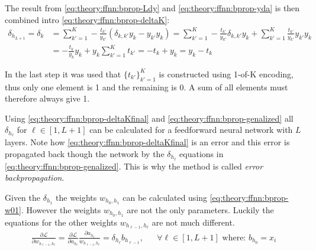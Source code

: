 The result from \eqref{eq:theory:ffnn:bprop-Ldy} and \eqref{eq:theory:ffnn:bprop-yda} is then combined intro \eqref{eq:theory:ffnn:bprop-deltaK}:
\begin{equation}
\begin{aligned}
\delta_{h_{L + 1}} = \delta_k &= \sum_{k'=1}^K -\frac{t_{k'}}{y_{k'}} \left( \delta_{k, k'} y_k - y_{k'} y_k \right) = \sum_{k'=1}^K -\frac{t_{k'}}{y_{k'}} \delta_{k, k'} y_k + \sum_{k'=1}^K \frac{t_{k'}}{y_{k'}} y_{k'} y_k \\
&= -\frac{t_k}{y_k} y_k + y_k \sum_{k'=1}^K t_{k'} = -t_k + y_k = y_k - t_k
\end{aligned}
\label{eq:theory:ffnn:bprop-deltaKfinal}
\end{equation}

In the last step it was used that $\{ t_{k'} \}_{k'=1}^K$ is constructed using 1-of-K encoding, thus only one element is 1 and the remaining is 0. A sum of all elements must therefore always give 1.

Using \eqref{eq:theory:ffnn:bprop-deltaKfinal} and \eqref{eq:theory:ffnn:bprop-genalized} all $\delta_{h_\ell}$ for $\ell \in [1, L+1]$ can be calculated for a feedforward neural network with $L$ layers. Note how \eqref{eq:theory:ffnn:bprop-deltaKfinal} is an error and this error is propagated back though the network by the $\delta_{h_\ell}$ equations in \eqref{eq:theory:ffnn:bprop-genalized}. This is why the method is called \textit{error backpropagation}.

Given the $\delta_{h_1}$ the weights $w_{h_0, h_1}$ can be calculated using \eqref{eq:theory:ffnn:bprop-w01}. However the weights $w_{h_0, h_1}$ are not the only parameters. Luckily the equations for the other weights $w_{h_{\ell-1}, h_\ell}$ are not much different.
\begin{equation}
\begin{aligned}
\frac{\partial \mathcal{L}}{\partial w_{h_{\ell-1}, h_\ell}} = \frac{\partial \mathcal{L}}{\partial a_{h_\ell}}
\frac{\partial a_{h_\ell}}{w_{h_{\ell-1}, h_\ell}} = \delta_{h_\ell} b_{h_{\ell-1}}, && \forall \ell \in [1, L+1] \text{ where: } b_{h_0} = x_i
\end{aligned}
\end{equation}

